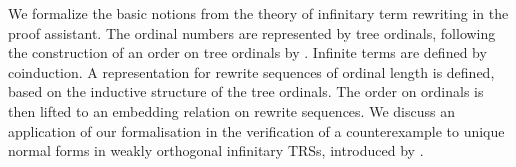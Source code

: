 
We formalize the basic notions from the theory of infinitary
term rewriting in the \Coq proof assistant. The ordinal numbers are
represented by tree ordinals, following the construction of an order on tree ordinals
by \citet{hancock-08}. Infinite terms are defined by coinduction. A
representation for rewrite sequences of ordinal length is defined,
based on the inductive structure of the tree ordinals. The order on
ordinals is then lifted to an embedding relation on rewrite sequences.
We discuss an application of our formalisation in the verification of
a counterexample to unique normal forms in weakly orthogonal
infinitary TRSs, introduced by \citet{endrullis-10}.

